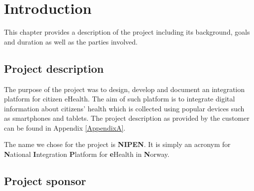 
\chapter{Introduction} 
\label{Introduction} 


This chapter provides a description of the project including its background, goals and duration as well as the parties involved.

\section{Project description}
\label{section:description}

The purpose of the project was to design, develop and document an integration platform for citizen eHealth. \cite{ehealth} %
The aim of such platform is to integrate digital information about citizens' health which is collected using popular devices such as smartphones and tablets.
The project description as provided by the customer can be found in Appendix \ref{AppendixA}.



The name we chose for the project is \textbf{NIPEN}.\newline
It is simply an acronym for \textbf{N}ational \textbf{I}ntegration \textbf{P}latform for \textbf{e}Health in \textbf{N}orway.

\section{Project sponsor}
\label{section:client}

